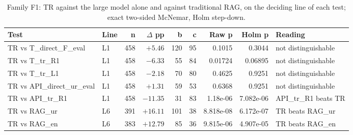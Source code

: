\begin{table}[t]
\centering
\small
\caption{Family F1: TR against the large model alone and against traditional RAG, on the deciding line of each test; exact two-sided McNemar, Holm step-down.}
\label{tab:d13-f1-tests}
\begin{tabular}{llrrrrrrl}
\toprule
Test & Line & n & $\Delta$ pp & b & c & Raw p & Holm p & Reading \\
\midrule
TR vs T\_direct\_F\_eval & L1 & 458 & $+5.46$ & 120 & 95 & 0.1015 & 0.3044 & not distinguishable \\
TR vs T\_tr\_R1 & L1 & 458 & $-6.33$ & 55 & 84 & 0.01724 & 0.06895 & not distinguishable \\
TR vs T\_tr\_L1 & L1 & 458 & $-2.18$ & 70 & 80 & 0.4625 & 0.9251 & not distinguishable \\
TR vs API\_direct\_ur\_eval & L1 & 458 & $+1.31$ & 59 & 53 & 0.6368 & 0.9251 & not distinguishable \\
TR vs API\_tr\_R1 & L1 & 458 & $-11.35$ & 31 & 83 & 1.18e-06 & 7.082e-06 & API\_tr\_R1 beats TR \\
TR vs RAG\_ur & L6 & 391 & $+16.11$ & 101 & 38 & 8.818e-08 & 6.172e-07 & TR beats RAG\_ur \\
TR vs RAG\_en & L6 & 383 & $+12.79$ & 85 & 36 & 9.815e-06 & 4.907e-05 & TR beats RAG\_en \\
\bottomrule
\end{tabular}
\end{table}
